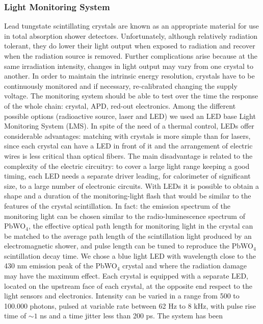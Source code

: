 \subsubsection{Light Monitoring System}
Lead tungstate scintillating crystals are known
as an appropriate material for use in total absorption
shower detectors. Unfortunately, although
relatively radiation tolerant, they do
lower their light output when exposed to radiation
and recover when the radiation source is
removed. Further complications
arise because at the same irradiation intensity, changes in light output may vary from
one crystal to another.
In order to maintain the intrinsic energy resolution, crystals
have to be continuously monitored and
if necessary, re-calibrated changing the supply voltage.
The monitoring system should be able to 
 test over the time  the response of the whole chain: crystal,
APD, red-out electronics.
Among the different possible options (radioactive source, laser and LED) we used an LED base Light Monitoring System (LMS). In spite of the
need of a thermal control, LEDs offer
considerable advantages: matching with
crystals is more simple than for lasers,
since each crystal can have a LED in
front of it and the arrangement of electric
wires is less critical than optical fibers.
The main disadvantage is related to the
complexity of the electric circuitry: to
cover a large light range keeping a good
timing, each LED needs a separate driver
leading, for calorimeter of significant size,
to a large number of electronic circuits.
With LEDs it is
possible to obtain a shape and a duration
of the monitoring-light flash that would be
similar to the features of the crystal scintillation.
In fact: the emission spectrum of
the monitoring light can be chosen similar to
the radio-luminescence spectrum of PbWO$_4$,
the effective optical path length for monitoring
light in the crystal can be matched to
the average path length of the scintillation
light produced by an electromagnetic shower,
and pulse length can be tuned to reproduce
the PbWO$_4$ scintillation decay time. We chose a blue light LED with wavelength close to the 430 nm emission
peak of the PbWO$_4$ crystal and where the
radiation damage may have the maximum effect.
Each crystal is equipped with a separate LED, located on
the upstream face of each crystal, at the
opposite end respect to the light sensors
and electronics. Intensity can be varied in
a range from 500 to 100.000 photons, pulsed at  variable rate between 62 Hz to 8 kHz, with pulse rise time of $\sim1$ ns and a time jitter less than 200 ps. The system has been 

